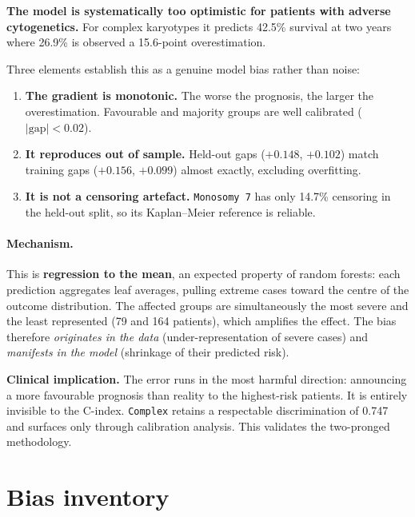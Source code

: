 \documentclass[11pt,a4paper]{article}
\newcommand{\var}[1]{\texttt{#1}}                      %
\begin{document}
\textbf{The model is systematically too optimistic for patients with adverse cytogenetics.} For
complex karyotypes it predicts 42.5\% survival at two years where 26.9\% is observed a
15.6-point overestimation.

Three elements establish this as a genuine model bias rather than noise:

\begin{enumerate}[leftmargin=*]
  \item \textbf{The gradient is monotonic.} The worse the prognosis, the larger the
        overestimation. Favourable and majority groups are well calibrated
        ($|\text{gap}| < 0.02$).
  \item \textbf{It reproduces out of sample.} Held-out gaps ($+0.148$, $+0.102$) match training
        gaps ($+0.156$, $+0.099$) almost exactly, excluding overfitting.
  \item \textbf{It is not a censoring artefact.} \var{Monosomy 7} has only 14.7\% censoring in
        the held-out split, so its Kaplan--Meier reference is reliable.
\end{enumerate}

\paragraph{Mechanism.}
This is \textbf{regression to the mean}, an expected property of random forests: each
prediction aggregates leaf averages, pulling extreme cases toward the centre of the outcome
distribution. The affected groups are simultaneously the most severe and the least represented
(79 and 164 patients), which amplifies the effect. The bias therefore \emph{originates in the
data} (under-representation of severe cases) and \emph{manifests in the model} (shrinkage of
their predicted risk).

\begin{keybox}
\textbf{Clinical implication.} The error runs in the most harmful direction: announcing a more
favourable prognosis than reality to the highest-risk patients. It is entirely invisible to the
C-index. \var{Complex} retains a respectable discrimination of 0.747 and surfaces only
through calibration analysis. This validates the two-pronged methodology.
\end{keybox}

\section{Bias inventory}
\end{document}
